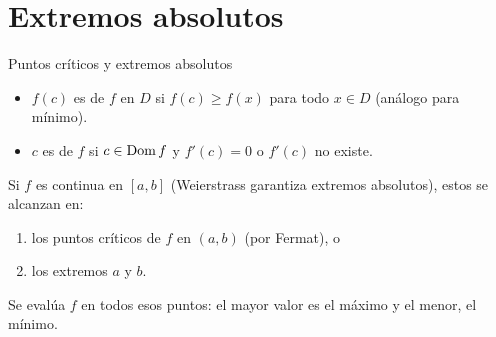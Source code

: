 \documentclass[10pt,aspectratio=169]{beamer}
\begin{document}
\section{Extremos absolutos}

\begin{frame}{Puntos críticos y extremos absolutos}
  \begin{definicion}
    \begin{itemize}
      \item $f(c)$ es  de $f$ en $D$ si $f(c)\ge f(x)$ para todo $x\in D$ (análogo para mínimo).
      \item $c$ es  de $f$ si $c\in\operatorname{Dom} f$ y $f'(c)=0$ o $f'(c)$ no existe.
    \end{itemize}
  \end{definicion}
  \begin{teorema}
    Si $f$ es continua en $[a,b]$ (Weierstrass garantiza extremos absolutos), estos se alcanzan en:
    \begin{enumerate}
      \item los puntos críticos de $f$ en $(a,b)$ (por Fermat), o
      \item los extremos $a$ y $b$.
    \end{enumerate}
    Se evalúa $f$ en todos esos puntos: el mayor valor es el máximo y el menor, el mínimo.
  \end{teorema}
\end{frame}
\end{document}
